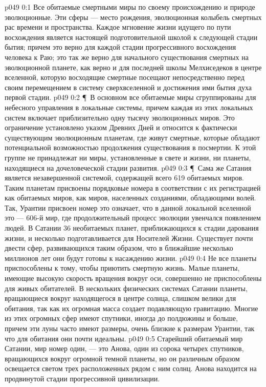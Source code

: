 \vs p049 0:1 Все обитаемые смертными миры по своему происхождению и природе эволюционные. Эти сферы --- место рождения, эволюционная колыбель смертных рас времени и пространства. Каждое мгновение жизни идущего по пути восхождения является настоящей подготовительной школой к следующей стадии бытия; причем это верно для каждой стадии прогрессивного восхождения человека к Раю; это так же верно для начального существования смертных на эволюционной планете, как верно и для последней школы Мелхиседеков в центре вселенной, которую восходящие смертные посещают непосредственно перед своим перемещением в систему сверхвселенной и достижения ими бытия духа первой стадии.
\vs p049 0:2 \P\ В основном все обитаемые миры сгруппированы для небесного управления в локальные системы, причем каждая из этих локальных систем включает приблизительно одну тысячу эволюционных миров. Это ограничение установлено указом Древних Дней и относится к фактически существующим эволюционным планетам, где живут смертные, которые обладают потенциальной возможностью продолжения существования в посмертии. К этой группе не принадлежат ни миры, установленные в свете и жизни, ни планеты, находящиеся на дочеловеческой стадии развития.
\vs p049 0:3 \P\ Сама же Сатания является незавершенной системой, содержащей всего 619 обитаемых миров. Таким планетам присвоены порядковые номера в соответствии с их регистрацией как обитаемых миров, как миров, населенных созданиями, обладающими волей. Так, Урантии присвоен номер  это означает, что в данной локальной вселенной это --- 606\hyp{}й мир, где продолжительный процесс эволюции увенчался появлением людей. В Сатании 36 необитаемых планет, приближающихся к стадии дарования жизни, и несколько подготавливается для Носителей Жизни. Существует почти двести сфер, развивающихся таким образом, что в ближайшие несколько миллионов лет они будут готовы к насаждению жизни.
\vs p049 0:4 Не все планеты приспособлены к тому, чтобы приютить смертную жизнь. Малые планеты, имеющие высокую скорость вращения вокруг оси, совершенно не приспособлены для живых обитателей. В нескольких физических системах Сатании планеты, вращающиеся вокруг находящегося в центре солнца, слишком велики для обитания, так как их огромная масса создает подавляющую гравитацию. Многие из этих огромных сфер имеют спутники, иногда до полдюжины и больше, причем эти луны часто имеют размеры, очень близкие к размерам Урантии, так что для обитания они почти идеальны.
\vs p049 0:5 Старейший обитаемый мир Сатании, мир номер один, --- это Анова, один из сорока четырех спутников, вращающихся вокруг огромной темной планеты, но он различным образом освещается светом трех расположенных рядом с ним солнц. Анова находится на продвинутой стадии прогрессивной цивилизации.
